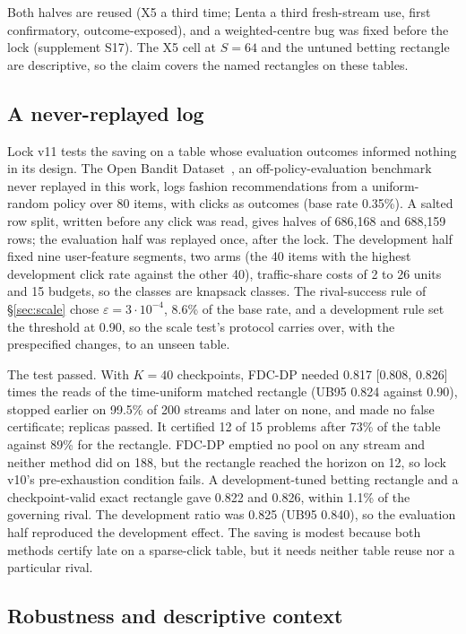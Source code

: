 \documentclass[sigconf,anonymous,review]{acmart}
\newcommand{\eps}{\varepsilon}
\begin{document}
Both halves are reused (X5 a third time; Lenta a third fresh-stream use, first confirmatory, outcome-exposed), and a weighted-centre bug was fixed before the lock (supplement S17). The X5 cell at $S = 64$ and the untuned betting rectangle are descriptive, so the claim covers the named rectangles on these tables.

\subsection{A never-replayed log}\label{sec:obd}

Lock v11 tests the saving on a table whose evaluation outcomes informed nothing in its design. The Open Bandit Dataset~\citep{saito2021open}, an off-policy-evaluation benchmark never replayed in this work, logs fashion recommendations from a uniform-random policy over 80 items, with clicks as outcomes (base rate 0.35\%). A salted row split, written before any click was read, gives halves of 686,168 and 688,159 rows; the evaluation half was replayed once, after the lock. The development half fixed nine user-feature segments, two arms (the 40 items with the highest development click rate against the other 40), traffic-share costs of 2 to 26 units and 15 budgets, so the classes are knapsack classes. The rival-success rule of \S\ref{sec:scale} chose $\eps = 3 \cdot 10^{-4}$, 8.6\% of the base rate, and a development rule set the threshold at 0.90, so the scale test's protocol carries over, with the prespecified changes, to an unseen table.

The test passed. With $K = 40$ checkpoints, FDC-DP needed 0.817 [0.808, 0.826] times the reads of the time-uniform matched rectangle (UB95 0.824 against 0.90), stopped earlier on 99.5\% of 200 streams and later on none, and made no false certificate; replicas passed. It certified 12 of 15 problems after 73\% of the table against 89\% for the rectangle. FDC-DP emptied no pool on any stream and neither method did on 188, but the rectangle reached the horizon on 12, so lock v10's pre-exhaustion condition fails. A development-tuned betting rectangle and a checkpoint-valid exact rectangle gave 0.822 and 0.826, within 1.1\% of the governing rival. The development ratio was 0.825 (UB95 0.840), so the evaluation half reproduced the development effect. The saving is modest because both methods certify late on a sparse-click table, but it needs neither table reuse nor a particular rival.

\subsection{Robustness and descriptive context}\label{sec:external}
\end{document}
